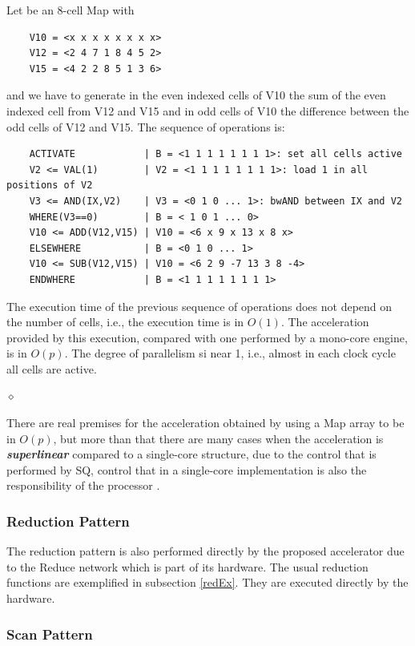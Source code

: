 \begin{exemplu}
Let be an $8$-cell Map with 
\begin{verbatim}
    V10 = <x x x x x x x x>
    V12 = <2 4 7 1 8 4 5 2>
    V15 = <4 2 2 8 5 1 3 6>
\end{verbatim}
and we have to generate in the even indexed cells of V10 the sum of  the even indexed cell from V12 and V15 and in odd cells of V10 the difference between the odd cells of V12 and V15. The sequence of operations is:
\begin{verbatim}
    ACTIVATE            | B = <1 1 1 1 1 1 1 1>: set all cells active
    V2 <= VAL(1)        | V2 = <1 1 1 1 1 1 1 1>: load 1 in all positions of V2
    V3 <= AND(IX,V2)    | V3 = <0 1 0 ... 1>: bwAND between IX and V2 
    WHERE(V3==0)        | B = < 1 0 1 ... 0>
    V10 <= ADD(V12,V15) | V10 = <6 x 9 x 13 x 8 x>
    ELSEWHERE           | B = <0 1 0 ... 1> 
    V10 <= SUB(V12,V15) | V10 = <6 2 9 -7 13 3 8 -4>
    ENDWHERE            | B = <1 1 1 1 1 1 1 1>
\end{verbatim}
The execution time of the previous sequence of operations does not depend on the number of cells, i.e., the execution time is in $O(1)$. The acceleration provided by this execution, compared with one performed by a mono-core engine, is in $O(p)$. The degree of parallelism si near 1, i.e., almost  in each clock cycle all cells are active. 

$\diamond$
\end{exemplu}

There are real premises for the acceleration obtained by using a Map array to be in $O(p)$, but more than that there are many cases when the acceleration is  {\bf {\em superlinear}} compared to a single-core structure, due to the control that is performed by SQ, control that in a single-core implementation is also the responsibility of the processor \cite{antonescu24a}.

\subsubsection{Reduction Pattern}

The reduction pattern is also performed directly by the proposed accelerator due to the Reduce network which is part of its hardware. The usual reduction functions are exemplified in subsection \ref{redEx}. They are executed directly by the hardware.

\subsubsection{Scan Pattern}

